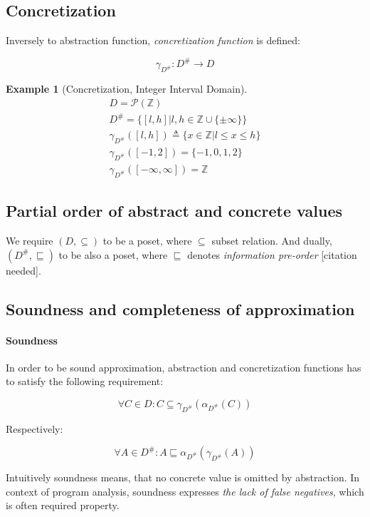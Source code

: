 \documentclass[12pt,oneside]{fithesis2}
\theoremstyle{definition}
\newtheorem{exmp}{Example}[section]
\begin{document}
\subsection{Concretization}
Inversely to abstraction function, \textit{concretization function} is defined: \cite{CousotCousot76-1}

\[
\gamma_{D^\#}\colon D^\# \to D
\]

\begin{exmp}[Concretization, Integer Interval Domain\cite{mine-WING12}]
  \begin{gather*}
    D = \mathcal P(\mathbb Z)\\
    D^\# = \{[l,h] | l,h \in \mathbb{Z} \cup \{\pm\infty\}\}\\
    \gamma_{D^\#}([l,h]) \triangleq \{x \in \mathbb Z | l \le x \le h\}\\
    \gamma_{D^\#}([-1,2]) = \{-1, 0, 1, 2\}\\
    \gamma_{D^\#}([-\infty, \infty]) = \mathbb Z
  \end{gather*}
\end{exmp}

\subsection{Partial order of abstract and concrete values}

We require $(D, \subseteq)$ to be a poset, where $\subseteq$ subset relation. And dually, $(D^\#, \sqsubseteq)$ to be also a poset, where $\sqsubseteq$ denotes \textit{information pre-order} [citation needed].

\subsection{Soundness and completeness of approximation}

\paragraph{Soundness}
In order to be sound approximation, abstraction and concretization functions has to satisfy the following requirement: \cite{mine-AIAA10}

\[
  \forall C \in D: C \subseteq \gamma_{D^\#}(\alpha_{D^\#}(C))
\]

Respectively:

\[
  \forall A \in D^\#: A \sqsubseteq \alpha_{D^\#}(\gamma_{D^\#}(A))
\]

Intuitively soundness means, that no concrete value is omitted by abstraction. In context of program analysis, soundness expresses \textit{the lack of false negatives}, which is often required property.
\end{document}
